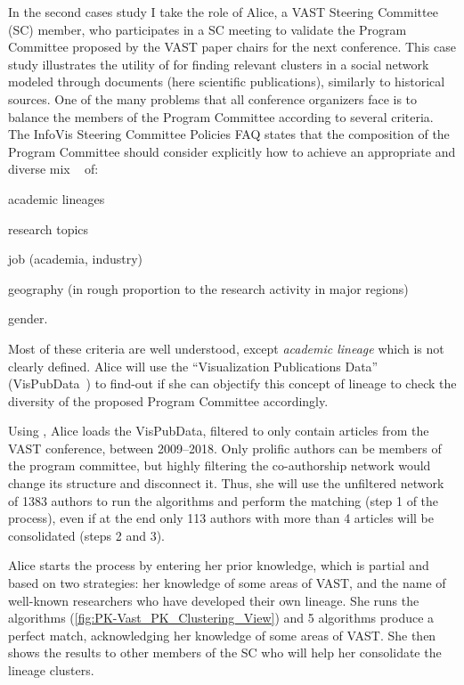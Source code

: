 In the second cases study I take the role of Alice, a VAST Steering Committee (SC) member, who participates in a SC meeting to validate the Program Committee proposed by the VAST paper chairs for the next conference.
This case study illustrates the utility of \pkclustering for finding relevant clusters in a social network modeled through documents (here scientific publications), similarly to historical sources.
One of the many problems that all conference organizers face is to balance the members of the Program Committee according to several criteria.
The InfoVis Steering Committee Policies FAQ states that the composition of the Program Committee should consider explicitly how to achieve an appropriate and diverse mix ~\cite{infovisfaq} of:
\begin{itemize*}
\item academic lineages
\item research topics
\item job (academia, industry)
\item geography (in rough proportion to the research activity in major regions)
\item gender.
\end{itemize*}
Most of these criteria are well understood, except \emph{academic lineage} which is not clearly defined.
Alice will use the ``Visualization Publications Data'' (VisPubData~\cite{VisPubData}) to find-out if she can objectify this concept of lineage to check the diversity of the proposed Program Committee accordingly.

Using \pkclustering, Alice loads the VisPubData, filtered to only contain articles from the VAST conference, between 2009--2018. Only prolific authors can be members of the program committee, but highly filtering the co-authorship network  would change its structure and disconnect it. Thus, she will use the unfiltered network of 1383 authors to run the algorithms and perform the matching (step 1 of the process), even if at the end only 113 authors with more than 4 articles will be consolidated (steps 2 and 3).

Alice starts the \pkclustering process by entering her prior knowledge, which is partial and based on two strategies: her knowledge of some areas of VAST, and the name of well-known researchers who have developed their own lineage. She runs the algorithms (\autoref{fig:PK-Vast_PK_Clustering_View}) and 5 algorithms produce a perfect match, acknowledging her knowledge of some areas of VAST. She then shows the results to other members of the SC who will help her consolidate the lineage clusters.

